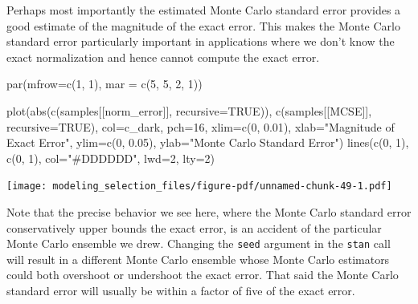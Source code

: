 \documentclass[
  letterpaper,
  DIV=11,
  numbers=noendperiod]{scrartcl}
\newenvironment{Shaded}{\begin{snugshade}}{\end{snugshade}}
\newcommand{\AttributeTok}[1]{\textcolor[rgb]{0.40,0.45,0.13}{#1}}
\newcommand{\ConstantTok}[1]{\textcolor[rgb]{0.56,0.35,0.01}{#1}}
\newcommand{\DecValTok}[1]{\textcolor[rgb]{0.68,0.00,0.00}{#1}}
\newcommand{\FloatTok}[1]{\textcolor[rgb]{0.68,0.00,0.00}{#1}}
\newcommand{\FunctionTok}[1]{\textcolor[rgb]{0.28,0.35,0.67}{#1}}
\newcommand{\NormalTok}[1]{\textcolor[rgb]{0.00,0.23,0.31}{#1}}
\newcommand{\StringTok}[1]{\textcolor[rgb]{0.13,0.47,0.30}{#1}}
\begin{document}
Perhaps most importantly the estimated Monte Carlo standard error
provides a good estimate of the magnitude of the exact error. This makes
the Monte Carlo standard error particularly important in applications
where we don't know the exact normalization and hence cannot compute the
exact error.

\begin{Shaded}
\begin{Highlighting}[]
\FunctionTok{par}\NormalTok{(}\AttributeTok{mfrow=}\FunctionTok{c}\NormalTok{(}\DecValTok{1}\NormalTok{, }\DecValTok{1}\NormalTok{), }\AttributeTok{mar =} \FunctionTok{c}\NormalTok{(}\DecValTok{5}\NormalTok{, }\DecValTok{5}\NormalTok{, }\DecValTok{2}\NormalTok{, }\DecValTok{1}\NormalTok{))}

\FunctionTok{plot}\NormalTok{(}\FunctionTok{abs}\NormalTok{(}\FunctionTok{c}\NormalTok{(samples[[}\StringTok{\textquotesingle{}norm\_error\textquotesingle{}}\NormalTok{]], }\AttributeTok{recursive=}\ConstantTok{TRUE}\NormalTok{)),}
         \FunctionTok{c}\NormalTok{(samples[[}\StringTok{\textquotesingle{}MCSE\textquotesingle{}}\NormalTok{]], }\AttributeTok{recursive=}\ConstantTok{TRUE}\NormalTok{),}
     \AttributeTok{col=}\NormalTok{c\_dark, }\AttributeTok{pch=}\DecValTok{16}\NormalTok{,}
     \AttributeTok{xlim=}\FunctionTok{c}\NormalTok{(}\DecValTok{0}\NormalTok{, }\FloatTok{0.01}\NormalTok{), }\AttributeTok{xlab=}\StringTok{"Magnitude of Exact Error"}\NormalTok{,}
     \AttributeTok{ylim=}\FunctionTok{c}\NormalTok{(}\DecValTok{0}\NormalTok{, }\FloatTok{0.05}\NormalTok{), }\AttributeTok{ylab=}\StringTok{"Monte Carlo Standard Error"}\NormalTok{)}
\FunctionTok{lines}\NormalTok{(}\FunctionTok{c}\NormalTok{(}\DecValTok{0}\NormalTok{, }\DecValTok{1}\NormalTok{), }\FunctionTok{c}\NormalTok{(}\DecValTok{0}\NormalTok{, }\DecValTok{1}\NormalTok{), }\AttributeTok{col=}\StringTok{"\#DDDDDD"}\NormalTok{, }\AttributeTok{lwd=}\DecValTok{2}\NormalTok{, }\AttributeTok{lty=}\DecValTok{2}\NormalTok{)}
\end{Highlighting}
\end{Shaded}

\texttt{[image: modeling\_selection\_files/figure-pdf/unnamed-chunk-49-1.pdf]}

Note that the precise behavior we see here, where the Monte Carlo
standard error conservatively upper bounds the exact error, is an
accident of the particular Monte Carlo ensemble we drew. Changing the
\texttt{seed} argument in the \texttt{stan} call will result in a
different Monte Carlo ensemble whose Monte Carlo estimators could both
overshoot or undershoot the exact error. That said the Monte Carlo
standard error will usually be within a factor of five of the exact
error.
\end{document}
